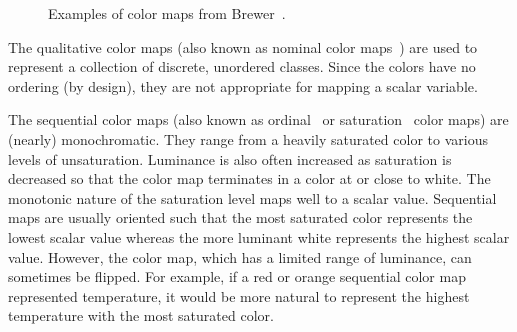 \documentclass{vgtc}                          %
\newcommand{\lcite}[1]{~\cite{#1}}
\newcommand{\scite}[1]{~\cite{#1}}
\begin{document}
\begin{figure}
  \centering
  \quad
  \quad
  \caption{Examples of color maps from Brewer\scite{Brewer05}.}
  \label{fig:BrewerExamples}
\end{figure}

The qualitative color maps (also known as nominal color maps\lcite{Ware04})
are used to represent a collection of discrete, unordered classes.  Since
the colors have no ordering (by design), they are not appropriate for
mapping a scalar variable.

The sequential color maps (also known as ordinal\lcite{Ware04} or
saturation\lcite{Rheingans99} color maps) are (nearly) monochromatic.  They
range from a heavily saturated color to various levels of unsaturation.
Luminance is also often increased as saturation is decreased so that the
color map terminates in a color at or close to white.  The monotonic nature
of the saturation level maps well to a scalar value.  Sequential maps are
usually oriented such that the most saturated color represents the lowest
scalar value whereas the more luminant white represents the highest scalar
value.  However, the color map, which has a limited range of luminance, can
sometimes be flipped.  For example, if a red or orange sequential color map
represented temperature, it would be more natural to represent the highest
temperature with the most saturated color.
\end{document}
